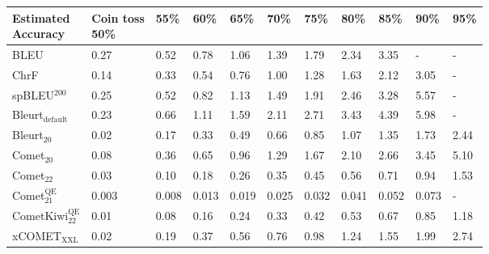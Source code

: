 \begin{tabular}{lllllllllll}
\toprule
\bf \makecell[l]{Estimated \\ Accuracy} & \bf \makecell[c]{{\small Coin toss}\\ 50\%} & \bf 55\% & \bf 60\% & \bf 65\% & \bf 70\% & \bf 75\% & \bf 80\% & \bf 85\% & \bf 90\% & \bf 95\% \\
\midrule
BLEU                                    &                                        0.27 &     0.52 &     0.78 &     1.06 &     1.39 &     1.79 &     2.34 &     3.35 &        - &        - \\
ChrF                                    &                                        0.14 &     0.33 &     0.54 &     0.76 &     1.00 &     1.28 &     1.63 &     2.12 &     3.05 &        - \\
spBLEU$^\textrm{200}$                   &                                        0.25 &     0.52 &     0.82 &     1.13 &     1.49 &     1.91 &     2.46 &     3.28 &     5.57 &        - \\
Bleurt$_\textrm{default}$               &                                        0.23 &     0.66 &     1.11 &     1.59 &     2.11 &     2.71 &     3.43 &     4.39 &     5.98 &        - \\
Bleurt$_\textrm{20}$                    &                                        0.02 &     0.17 &     0.33 &     0.49 &     0.66 &     0.85 &     1.07 &     1.35 &     1.73 &     2.44 \\
Comet$_\textrm{20}$                     &                                        0.08 &     0.36 &     0.65 &     0.96 &     1.29 &     1.67 &     2.10 &     2.66 &     3.45 &     5.10 \\
Comet$_\textrm{22}$                     &                                        0.03 &     0.10 &     0.18 &     0.26 &     0.35 &     0.45 &     0.56 &     0.71 &     0.94 &     1.53 \\
Comet$_\textrm{21}^\textrm{QE}$         &                                       0.003 &    0.008 &    0.013 &    0.019 &    0.025 &    0.032 &    0.041 &    0.052 &    0.073 &        - \\
CometKiwi$_\textrm{22}^\textrm{QE}$     &                                        0.01 &     0.08 &     0.16 &     0.24 &     0.33 &     0.42 &     0.53 &     0.67 &     0.85 &     1.18 \\
xCOMET$_\textrm{XXL}$                   &                                        0.02 &     0.19 &     0.37 &     0.56 &     0.76 &     0.98 &     1.24 &     1.55 &     1.99 &     2.74 \\

\end{tabular}
